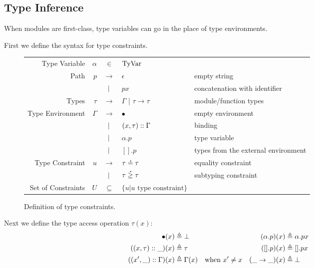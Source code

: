 \documentclass{article}
\begin{document}
\subsection{Type Inference}

When modules are first-class, type variables can go in the place of type environments.

First we define the syntax for type constraints.
\begin{figure}[h!]
  \centering
  \begin{tabular}{rrcll}
    Type Variable      & $\alpha$ & $\in$         & $\text{TyVar}$                                                               \\
    Path               & $p$      & $\rightarrow$ & $\epsilon$                       & empty string                        \\
                       &          & $|$       & $p x$                            & concatenation with identifier       \\
    Types              & $\tau$   & $\rightarrow$ & $\Gamma$ | $\tau\rightarrow\tau$ & module/function types               \\
    Type Environment   & $\Gamma$ & $\rightarrow$ & $\bullet$                        & empty environment                   \\
                       &          & $|$       & $(x,\tau):: \Gamma$           & binding                             \\
                       &          & $|$       & $\alpha.p$                       & type variable                       \\
                       &          & $|$       & $[].p$                           & types from the external environment \\
    Type Constraint    & $u$      & $\rightarrow$ & $\tau\overset{\,_{\mbox{\Large .}}}{=}\tau$                  & equality constraint                 \\
                       &          & $|$       & $\tau\overset{\,_{\mbox{\Large .}}}{\ge}\tau$                & subtyping constraint                \\
    Set of Constraints & $U$      & $\subseteq$   & $\{u|u\text{ type constraint}\}$
  \end{tabular}
  \caption{Definition of type constraints.}
  \label{fig:typeqdom}
\end{figure}

Next we define the type access operation $\tau(x)$:
\begin{align*}
  \bullet(x)              & \triangleq\bot      &                      &  & (\alpha.p)(x)        & \triangleq\alpha.px \\
  ((x,\tau)::\_)(x)    & \triangleq\tau      &                      &  & ([].p)(x)            & \triangleq[].px     \\
  ((x',\_)::\Gamma)(x) & \triangleq\Gamma(x) & \text{when }x'\neq x &  & (\_\rightarrow\_)(x) & \triangleq\bot
\end{align*}
\end{document}
